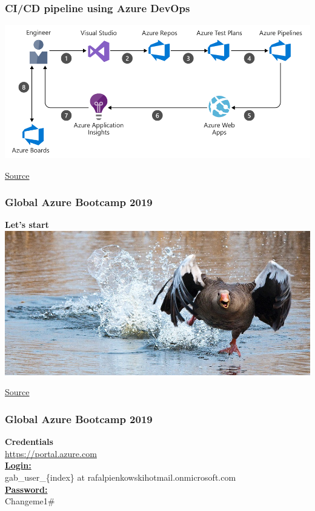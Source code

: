 \documentclass{beamer}
\def \prestitle {Global Azure Bootcamp 2019}
\newcommand{\source}[1]{
	\begin{flushright}
		\hfill {\scriptsize \href{#1}{Source}}	
	\end{flushright}
}
\begin{document}
\begin{frame}
\frametitle{CI/CD pipeline using Azure DevOps}

\includegraphics[width=\textwidth]{cicdpipeline.png} \\
\source{https://docs.microsoft.com/en-us/azure/architecture/example-scenario/apps/devops-dotnet-webapp}

\end{frame}


\begin{frame}
\frametitle{\prestitle}
\centering
\textbf{{\Huge Let's start}} \\
\vspace{5mm}
\includegraphics[width=.9\textwidth]{start.jpg}
\source{https://pixabay.com/photos/greylag-goose-goose-water-bird-wing-2139296/}
\end{frame}


\begin{frame}
\frametitle{\prestitle}

\textbf{{\LARGE Credentials}} \\
\vspace{3mm}
{\LARGE \href{https://portal.azure.com}{https://portal.azure.com}} \\
\vspace{5mm}
\underline{\textbf{{\Large Login:}}} \\ 
\vspace{3mm}
gab\_user\_\{index\} at rafalpienkowskihotmail.onmicrosoft.com \\
\vspace{2mm}
\underline{\textbf{{\Large Password:}}} \\ 
\vspace{2mm}
Changeme1\# \\
\end{frame}
\end{document}
